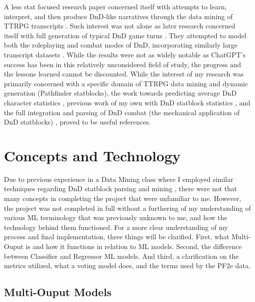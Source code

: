 \documentclass[11pt]{article}
\begin{document}
A less stat focused research paper concerned itself with attempts to learn, interpret, and then produce DnD-like narratives through the data mining of TTRPG transcripts \cite{louis-sutton-2018-deep}. Such interest was not alone as later research concerned itself with full generation of typical DnD game turns \cite{https://doi.org/10.48550/arxiv.2210.07109}. They attempted to model both the roleplaying and combat modes of DnD, incorporating similarly large transcript datasets \cite{https://doi.org/10.48550/arxiv.2210.07109}. While the results were not as widely notable as ChatGPT's success has been in this relatively unconsidered field of study, the progress and the lessons learned cannot be discounted. While the interest of my research was primarily concerned with a specific domain of TTRPG data mining and dynamic generation (Pathfinder statblocks), the work towards predicting average DnD character statistics \cite{MacInnes2019TheDS}, previous work of my own with DnD statblock statistics \cite{vess-dev_2022}, and the full integration and parsing of DnD combat (the mechanical application of DnD statblocks) \cite{https://doi.org/10.48550/arxiv.2210.07109}, proved to be useful references.

\section{Concepts and Technology}

Due to previous experience in a Data Mining class where I employed similar techniques regarding DnD statblock parsing and mining \cite{vess-dev_2022}, there were not that many concepts in completing the project that were unfamiliar to me. However, the project was not completed in full without a furthering of my understanding of various ML terminology that was previously unknown to me, and how the technology behind them functioned. For a more clear understanding of my process and final implementation, three things will be clarified. First, what Multi-Ouput is and how it functions in relation to ML models. Second, the difference between Classifier and Regressor ML models. And third, a clarification on the metrics utilized, what a voting model does, and the terms used by the PF2e data.

\subsection{Multi-Ouput Models}
\end{document}

